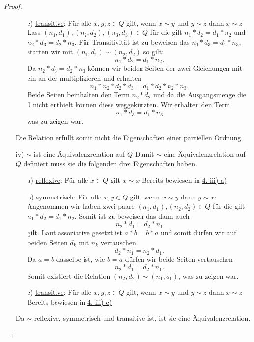 \documentclass{exam}
\begin{document}
\begin{proof}
\begin{enumerate}
\begin{enumerate}
			      \item [c)] \underline{transitive}: Für alle $x,y,z \in Q$ gilt, wenn $x \sim y$ und $y \sim z$ dann $x \sim z$ \newline
			            Lass $(n_1,d_1), (n_2,d_2), (n_3, d_3) \in Q$ für die gilt $n_1*d_2 = d_1*n_2$ und $n_2*d_3=d_2*n_3$.
			            Für Transitivität ist zu beweisen das $n_1*d_3=d_1*n_3$, starten wir mit $(n_1, d_1) \sim (n_2, d_2)$ so gilt: \[
				            n_1*d_2 = d_1*n_2.
			            \]
			            Da $n_2*d_3=d_2*n_3$ können wir beiden Seiten der zwei Gleichungen mit ein an der multiplizieren und erhalten \[
				            n_1*n_2*d_2*d_3 = d_1*d_2*n_2*n_3.
			            \]
			            Beide Seiten beinhalten den Term $n_2*d_2$ und da die Ausgangsmenge die $0$ nicht enthielt können diese weggekürzten.
			            Wir erhalten den Term \[
				            n_1*d_3 = d_1*n_3
			            \] was zu zeigen war. \checkmark
		      \end{enumerate}
		      Die Relation erfüllt somit nicht die Eigenschaften einer partiellen Ordnung.
		\item [iv)] $\sim$ ist eine Äquivalenzrelation auf $Q$ \newline
		      Damit $\sim$ eine Äquivalenzrelation auf $Q$ definiert muss sie die folgenden drei Eigenschaften haben.
		      \begin{enumerate}
			      \item [a)] \underline{reflexive}: Für alle $x \in Q$ gilt $x \sim x$ \newline
			            Bereits bewiesen in \underline{4. iii) a)}
			      \item [b)] \underline{symmetrisch}: Für alle $x,y \in Q$ gilt, wenn $x \sim y$ dann $y \sim x$: \newline
			            Angenommen wir haben zwei paare $(n_1,d_1),(n_2,d_2) \in Q$ für die gilt $n_1*d_2=d_1*n_2$.
			            Somit ist zu beweisen das dann auch \[
				            n_2*d_1 = d_2*n_1
			            \] gilt.
			            \newline\newline
			            Laut assoziative gesetzt ist $a*b = b*a$ und somit dürfen wir auf beiden Seiten $d_k$ mit $n_k$ vertauschen.
			            \[
				            d_2*n_1=n_2*d_1.
			            \]
			            Da $a = b$ dasselbe ist, wie $b = a$ dürfen wir beide Seiten vertauschen \[
				            n_2*d_1 = d_2*n_1.
			            \]
			            Somit existiert die Relation $(n_2,d_2) \sim (n_1, d_1)$, was zu zeigen war.
			      \item [c)] \underline{transitive}: Für alle $x,y,z \in Q$ gilt, wenn $x \sim y$ und $y \sim z$ dann $x \sim z$ \newline
			            Bereits bewiesen in \underline{4. iii) c)}
		      \end{enumerate}
		      Da $\sim$ reflexive, symmetrisch und transitive ist, ist sie eine Äquivalenzrelation.
	\end{enumerate}
\end{proof}
\end{document}
